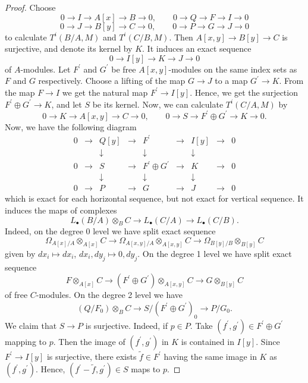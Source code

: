 \documentclass{article}
\theoremstyle{definition}
\begin{document}
\begin{proof}
Choose
\[
0\longrightarrow I\longrightarrow A[x]\longrightarrow B\longrightarrow 0,\qquad 
0\longrightarrow Q\longrightarrow F\longrightarrow I\longrightarrow 0
\]
\[
0\longrightarrow J\longrightarrow B[y]\longrightarrow C\longrightarrow 0,\qquad 
0\longrightarrow P\longrightarrow G\longrightarrow J\longrightarrow 0
\]
to calculate \(T^{i}(B / A, M)\) and \(T^{i}(C / B, M)\). Then \(A[x, y] \to B[y] \to C\) is surjective, and denote its kernel by \(K\). It induces an exact sequence
\[
0\longrightarrow I[y]\longrightarrow K\longrightarrow J\longrightarrow 0
\]
of \(A\)-modules. Let \(F^{\prime}\) and \(G^{\prime}\) be free \(A[x,y]\)-modules on the same index sets as \(F\) and \(G\) respectively. Choose a lifting of the map \(G\to J\) to a map \(G^{\prime}\to K\). From the map \(F\to I\) we get the natural map \(F^{\prime}\to I[y]\). Hence, we get the surjection \(F^{\prime}\oplus G^{\prime}\to K\), and let \(S\) be its kernel. Now, we can calculate \(T^{i}(C/A, M)\) by
\[
0 \to K \to A[x,y] \to C \to 0,\qquad
0 \to S \to F^{\prime}\oplus G^{\prime} \to K \to 0.
\]
Now, we have the following diagram
\[
\begin{array}{ccccccccc}
0 & \to & Q[y] & \to & F^{\prime} & \to & I[y] & \to & 0 \\
& & \downarrow & & \downarrow & & \downarrow & & \\
0 & \to & S & \to & F^{\prime}\oplus G^{\prime} & \to & K & \to & 0 \\
& & \downarrow & & \downarrow & & \downarrow & & \\
0 & \to & P & \to & G & \to & J & \to & 0
\end{array}
\]
which is exact for each horizontal sequence, but not exact for vertical sequence. It induces the maps of complexes
\[
L_{\bullet}(B/A) \otimes_B C \to L_{\bullet}(C/A) \to L_{\bullet}(C/B).
\]
Indeed, on the degree 0 level we have split exact sequence
\[
\varOmega_{A[x]/A}\otimes_{A[x]} C \to \varOmega_{A[x,y]/A}\otimes_{A[x,y]} C \to \varOmega_{B[y]/B}\otimes_{B[y]} C
\]
given by \(dx_i \mapsto dx_i\), \(dx_i, dy_j \mapsto 0, dy_j\).
On the degree 1 level we have split exact sequence
\[
F \otimes_{A[x]} C \to (F^{\prime}\oplus G^{\prime})\otimes_{A[x,y]} C \to G \otimes_{B[y]} C
\]
of free \(C\)-modules. On the degree 2 level we have
\[
(Q/F_0)\otimes_B C \to S/(F^{\prime}\oplus G^{\prime})_0 \to P/G_0. \tag{11}
\]
We claim that \(S\to P\) is surjective. Indeed, if \(p\in P\). Take \((f^{\prime}, g^{\prime})\in F^{\prime}\oplus G^{\prime}\) mapping to \(p\). Then the image of \((f^{\prime}, g^{\prime})\) in \(K\) is contained in \(I[y]\). Since \(F^{\prime}\to I[y]\) is surjective, there exists \(\tilde f\in F^{\prime}\) having the same image in \(K\) as \((f^{\prime}, g^{\prime})\). Hence, \((f^{\prime}-\tilde f, g^{\prime})\in S\) maps to \(p\).


\end{proof}
\end{document}
